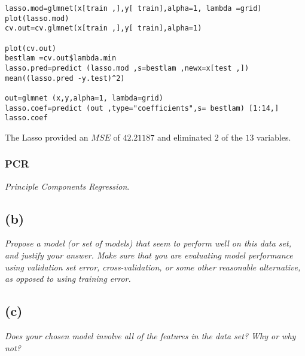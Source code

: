 \documentclass[a4paper,man,natbib]{apa6}
\begin{document}
\begin{verbatim}
lasso.mod=glmnet(x[train ,],y[ train],alpha=1, lambda =grid)
plot(lasso.mod)
cv.out=cv.glmnet(x[train ,],y[ train],alpha=1)

plot(cv.out)
bestlam =cv.out$lambda.min
lasso.pred=predict (lasso.mod ,s=bestlam ,newx=x[test ,])
mean((lasso.pred -y.test)^2)

out=glmnet (x,y,alpha=1, lambda=grid)
lasso.coef=predict (out ,type="coefficients",s= bestlam) [1:14,]
lasso.coef
\end{verbatim}

The Lasso provided an $MSE$ of $42.21187$ and eliminated $2$ of the $13$ variables.

\subsubsection{PCR} \emph{Principle Components Regression}.\\



\subsection{(b)} 
\emph{Propose a model (or set of models) that seem to perform well on
	this data set, and justify your answer. Make sure that you are
	evaluating model performance using validation set error, cross-validation, or some other reasonable alternative, as opposed to
	using training error.}

\subsection{(c)} 
\emph{Does your chosen model involve all of the features in the data
	set? Why or why not?}
\end{document}
